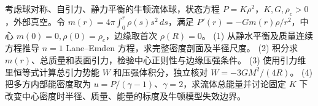 考虑球对称、自引力、静力平衡的牛顿流体球，状态方程 \(P=K\rho^2\)，\(K,G,\rho_c>0\)，外部真空。令 \(m(r)=4\pi\int_0^r \rho(s)s^2\,ds\)，满足 \(P'(r)=-Gm(r)\rho/r^2\)，中心 \(m(0)=0,\rho(0)=\rho_c\)，边缘取首次 \(\rho(R)=0\)。
(1) 从静水平衡及质量连续方程推导 \(n=1\) Lane–Emden 方程，求完整密度剖面及半径尺度。
(2) 积分求 \(m(r)\)、总质量和表面引力，检验中心正则性与边缘压强条件。
(3) 使用引力维里恒等式计算总引力势能 \(W\) 和压强体积分，独立核对 \(W=-3GM^2/(4R)\)。
(4) 把多方内部能密度取为 \(u=P/(\gamma-1)\)、\(\gamma=2\)，求流体总能量并讨论固定 \(K\) 下改变中心密度时半径、质量、能量的标度及牛顿模型失效边界。
